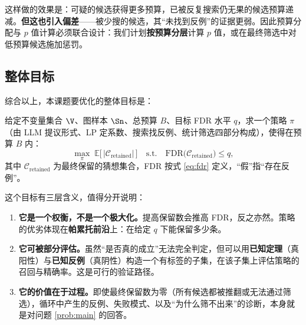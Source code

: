 这样做的效果是：可疑的候选获得更多预算，已被反复搜索仍无果的候选预算递减。\textbf{但这也引入偏差}——被少搜的候选，其“未找到反例”的证据更弱。因此预算分配与 $p$ 值计算必须联合设计：我们计划\textbf{按预算分层}计算 $p$ 值，或在最终筛选中对低预算候选施加惩罚。

\subsection{整体目标}
\label{sec:f-obj}

综合以上，本课题要优化的整体目标是：

\begin{keybox}[形式化目标]
给定不变量集合 $\V$、图样本 $\Sn$、总预算 $B$、目标 FDR 水平 $q$，求一个策略 $\pi$（由 LLM 提议形式、LP 定系数、搜索找反例、统计筛选四部分构成），使得在预算 $B$ 内：
\begin{equation}
  \max_{\pi}\; \mathbb{E}\bigl[\,|\mathcal{C}_{\text{retained}}|\,\bigr]
  \quad\text{s.t.}\quad
  \mathrm{FDR}\bigl(\mathcal{C}_{\text{retained}}\bigr)\le q,
  \label{eq:objective}
\end{equation}
其中 $\mathcal{C}_{\text{retained}}$ 为最终保留的猜想集合，FDR 按式 \eqref{eq:fdr} 定义，“假”指“存在反例”。
\end{keybox}

这个目标有三层含义，值得分开说明：

\begin{enumerate}[label=(\roman*)]
  \item \textbf{它是一个权衡，不是一个极大化。}提高保留数会推高 FDR，反之亦然。策略的优劣体现在\textbf{帕累托前沿}上：在给定 $q$ 下能保留多少条。
  \item \textbf{它可被部分评估。}虽然“是否真的成立”无法完全判定，但可以用\textbf{已知定理}（真阳性）与\textbf{已知反例}（真阴性）构造一个有标签的子集，在该子集上评估策略的召回与精确率。这是可行的验证路径。
  \item \textbf{它的价值在于过程。}即使最终保留数为零（所有候选都被推翻或无法通过筛选），循环中产生的反例、失败模式、以及“为什么筛不出来”的诊断，本身就是对问题 \ref{prob:main} 的回答。
\end{enumerate}
